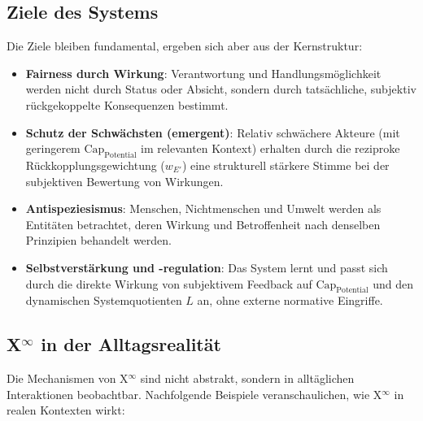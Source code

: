 \documentclass[12pt]{scrartcl}
\begin{document}
\subsection{Ziele des Systems}
Die Ziele bleiben fundamental, ergeben sich aber aus der Kernstruktur:
\begin{itemize}
    \item \textbf{Fairness durch Wirkung}: Verantwortung und Handlungsmöglichkeit werden nicht durch Status oder Absicht, sondern durch tatsächliche, subjektiv rückgekoppelte Konsequenzen bestimmt.
    \item \textbf{Schutz der Schwächsten (emergent)}: Relativ schwächere Akteure (mit geringerem $\text{Cap}_{\text{Potential}}$ im relevanten Kontext) erhalten durch die reziproke Rückkopplungsgewichtung ($w_{E'}$) eine strukturell stärkere Stimme bei der subjektiven Bewertung von Wirkungen.
    \item \textbf{Antispeziesismus}: Menschen, Nichtmenschen und Umwelt werden als Entitäten betrachtet, deren Wirkung und Betroffenheit nach denselben Prinzipien behandelt werden.
    \item \textbf{Selbstverstärkung und -regulation}: Das System lernt und passt sich durch die direkte Wirkung von subjektivem Feedback auf $\text{Cap}_{\text{Potential}}$ und den dynamischen Systemquotienten $L$ an, ohne externe normative Eingriffe.
\end{itemize}

\subsection{\texorpdfstring{X$^\infty$}{X-Unendlich} in der Alltagsrealität}
\label{sec:Alltagsrealitaet}

Die Mechanismen von X$^\infty$ sind nicht abstrakt, sondern in alltäglichen Interaktionen beobachtbar. Nachfolgende Beispiele veranschaulichen, wie X$^\infty$ in realen Kontexten wirkt:
\end{document}
